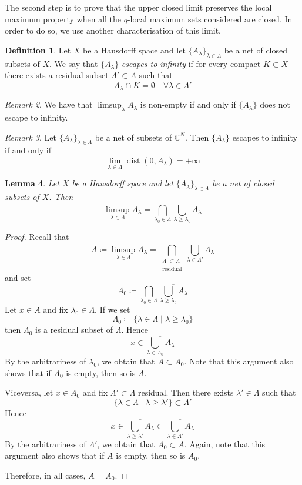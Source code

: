 \documentclass[reqno,oneside]{amsart}
\newcommand{\numberset}{\mathbb}
\newcommand{\C}{\numberset{C}}
\theoremstyle{definition}
\newtheorem{definition}{Definition}[section]
\theoremstyle{plain}
\newtheorem{lemma}[definition]{Lemma}
\theoremstyle{remark}
\newtheorem{remark}[definition]{Remark}
\begin{document}
The second step is to prove that the upper closed limit preserves the local maximum property when all the $q$-local maximum sets considered are closed. In order to do so, we use another characterisation of this limit.
\begin{definition}
	Let $X$ be a Hausdorff space and let $\{A_\lambda\}_{\lambda\in\Lambda}$ be a net of closed subsets of $X$. We say that $\{A_\lambda\}$ \emph{escapes to infinity} if for every compact $K\subset X$ there exists a residual subset $\Lambda'\subset\Lambda$ such that 
	\[
		A_\lambda\cap K=\emptyset \quad \forall\lambda\in\Lambda'
	\]
\end{definition}
\begin{remark}
\label{rem:limsup}
	We have that $\limsup_\lambda A_\lambda$ is non-empty if and only if $\{A_\lambda\}$ does not escape to infinity.
\end{remark}
\begin{remark}
\label{rem:escaping}
	Let $\{A_\lambda\}_{\lambda\in\Lambda}$ be a net of subsets of $\C^N$. Then $\{A_\lambda\}$ escapes to infinity if and only if
	\[
		\lim_{\lambda\in\Lambda} \operatorname{dist}(0,A_\lambda)=+\infty
	\]
\end{remark}

\begin{lemma}
\label{lemma:characterisation_new}
	Let $X$ be a Hausdorff space and let $\{A_\lambda\}_{\lambda\in\Lambda}$ be a net of closed subsets of $X$. Then
	\[
		\limsup_{\lambda\in\Lambda} A_\lambda=\bigcap_{\lambda_0\in\Lambda}\overline{\bigcup_{\lambda\geq\lambda_0} A_\lambda}
	\]
\end{lemma}
\begin{proof}
	Recall that
	\[
		A\coloneqq\limsup_{\lambda\in\Lambda} A_\lambda=\bigcap_{\substack{\Lambda'\subset\Lambda \\ \text{residual}}}\overline{\bigcup_{\lambda\in\Lambda'} A_\lambda}
	\]
	and set
	\[
		A_0\coloneqq\bigcap_{\lambda_0\in\Lambda}\overline{\bigcup_{\lambda\geq\lambda_0} A_\lambda}
	\]
	Let $x\in A$ and fix $\lambda_0\in\Lambda$. If we set
	\[
		\Lambda_0\coloneqq\{\lambda\in\Lambda \mid \lambda\geq\lambda_0\}
	\]
	then $\Lambda_0$ is a residual subset of $\Lambda$.
	Hence
	\[
		x\in\overline{\bigcup_{\lambda\in\Lambda_0} A_\lambda}
	\]
	By the arbitrariness of $\lambda_0$, we obtain that $A\subset A_0$. Note that this argument also shows that if $A_0$ is empty, then so is $A$.
	
	Viceversa, let $x\in A_0$ and fix $\Lambda'\subset\Lambda$ residual. Then there exists $\lambda'\in\Lambda$ such that
	\[
		\{\lambda\in\Lambda \mid \lambda\geq\lambda'\}\subset\Lambda'
	\]
	Hence
	\[
		x\in\overline{\bigcup_{\lambda\geq\lambda'} A_\lambda}\subset\overline{\bigcup_{\lambda\in\Lambda'} A_\lambda}
	\]
	By the arbitrariness of $\Lambda'$, we obtain that $A_0\subset A$. Again, note that this argument also shows that if $A$ is empty, then so is $A_0$.
	
	Therefore, in all cases, $A=A_0$.
\end{proof}
\end{document}
